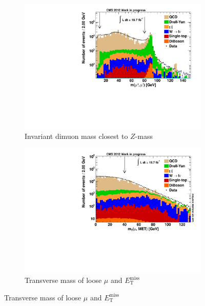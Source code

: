 \begin{figure}[htbp!]
  \ContinuedFloat
  \centering
  \begin{subfigure}[b]{0.495\textwidth}
    \centering
    \includegraphics[width=\textwidth]{plots/nTL_zmass.pdf}
    \caption{Invariant dimuon mass closest to $Z$-mass \label{fig:ntlzmass}}
  \end{subfigure}
  \begin{subfigure}[b]{0.495\textwidth}
    \centering
    \includegraphics[width=\textwidth]{plots/nTL_mt.pdf}
    \caption{Transverse mass of loose $\mu$ and $E_{\text{T}}^{\text{miss}}$ \label{fig:ntlmt}}
  \end{subfigure}
\end{figure}

